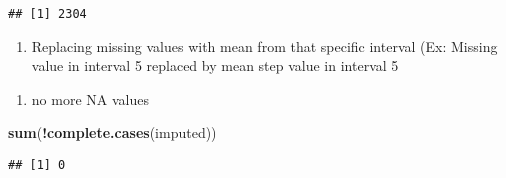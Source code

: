 \documentclass[]{article}
\newenvironment{Shaded}{\begin{snugshade}}{\end{snugshade}}
\newcommand{\KeywordTok}[1]{\textcolor[rgb]{0.13,0.29,0.53}{\textbf{#1}}}
\newcommand{\DataTypeTok}[1]{\textcolor[rgb]{0.13,0.29,0.53}{#1}}
\newcommand{\StringTok}[1]{\textcolor[rgb]{0.31,0.60,0.02}{#1}}
\newcommand{\OperatorTok}[1]{\textcolor[rgb]{0.81,0.36,0.00}{\textbf{#1}}}
\newcommand{\NormalTok}[1]{#1}
\providecommand{\tightlist}{%
  \setlength{\itemsep}{0pt}\setlength{\parskip}{0pt}}
\begin{document}
\begin{verbatim}
## [1] 2304
\end{verbatim}

\begin{enumerate}
\def\labelenumi{\arabic{enumi}.}
\setcounter{enumi}{11}
\tightlist
\item
  Replacing missing values with mean from that specific interval (Ex:
  Missing value in interval 5 replaced by mean step value in interval 5
\end{enumerate}

\begin{Shaded}
\end{Shaded}

\begin{enumerate}
\def\labelenumi{\arabic{enumi}.}
\setcounter{enumi}{12}
\tightlist
\item
  no more NA values
\end{enumerate}

\begin{Shaded}
\begin{Highlighting}[]
\KeywordTok{sum}\NormalTok{(}\OperatorTok{!}\KeywordTok{complete.cases}\NormalTok{(imputed))}
\end{Highlighting}
\end{Shaded}

\begin{verbatim}
## [1] 0
\end{verbatim}
\end{document}
